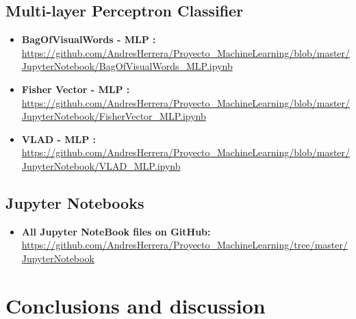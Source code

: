 \documentclass[12pt]{article}
\numberwithin{equation}{section}
\numberwithin{table}{section}
\numberwithin{figure}{section}
\begin{document}
\subsection{Multi-layer Perceptron Classifier }

\begin{itemize}
	\item {\textbf{BagOfVisualWords - MLP :} } \url{https://github.com/AndresHerrera/Proyecto_MachineLearning/blob/master/JupyterNotebook/BagOfVisualWords_MLP.ipynb}
	
	\item {\textbf{Fisher Vector - MLP :} } \url{	https://github.com/AndresHerrera/Proyecto_MachineLearning/blob/master/JupyterNotebook/FisherVector_MLP.ipynb}
	
	\item {\textbf{VLAD - MLP :} } \url{	https://github.com/AndresHerrera/Proyecto_MachineLearning/blob/master/JupyterNotebook/VLAD_MLP.ipynb}
	
\end{itemize}






\subsection{Jupyter Notebooks}
\begin{itemize}
	\item {\textbf{All Jupyter NoteBook files on GitHub:} } \url{https://github.com/AndresHerrera/Proyecto_MachineLearning/tree/master/JupyterNotebook} 
\end{itemize}

	
	
\section{Conclusions and discussion}
\end{document}
